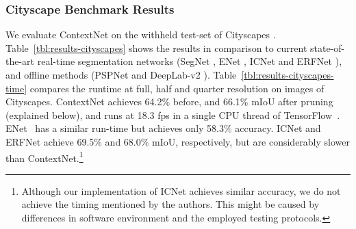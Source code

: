 \documentclass[runningheads]{llncs}
\begin{document}
\subsubsection{Cityscape Benchmark Results}
We evaluate ContextNet on the withheld test-set of Cityscapes \cite{cityscaples2016}. Table~\ref{tbl:results-cityscapes} shows the results in comparison to current state-of-the-art real-time segmentation networks (SegNet \cite{badrinarayanan2017}, ENet \cite{paszke2016}, ICNet \cite{zhao2017b} and ERFNet \cite{romera2018}), and offline methods (PSPNet \cite{zhao2017a} and DeepLab-v2 \cite{chen2016}). Table~\ref{tbl:results-cityscapes-time} compares the runtime at full, half and quarter resolution on images of Cityscapes. ContextNet achieves 64.2\% before, and 66.1\% mIoU after pruning (explained below), and runs at 18.3 fps in a single CPU thread of TensorFlow~\cite{tensorflow2015}. ENet~\cite{paszke2016} has a similar run-time but achieves only 58.3\% accuracy. ICNet \cite{zhao2017b} and ERFNet \cite{romera2018} achieve 69.5\% and 68.0\% mIoU, respectively, but are considerably slower than ContextNet.\footnote{Although our implementation of ICNet \cite{zhao2017b} achieves similar accuracy, we do not achieve the timing mentioned by the authors. This might be caused by differences in software environment and the employed testing protocols.}
\begin{table}[t]
\begin{center}
\end{center}
      \caption{Cityscape benchmark results for the proposed ContextNet and similar networks. DeepLab-v2~\cite{chen2016} and PSPNet~\cite{zhao2017a} are considered offline approaches. Runtime of other methods is shown in Table~\ref{tbl:results-cityscapes-time}. (Methods with `*' are pre-trained on ImageNet \cite{imagenet2015}.)}
  \label{tbl:results-cityscapes}
\end{table}
\end{document}
